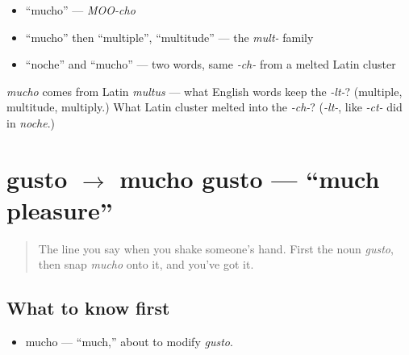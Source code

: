 \begin{itemize}
\raggedright
  \item \textquotedblleft{}mucho\textquotedblright{} — \emph{MOO-cho}
  \item \textquotedblleft{}mucho\textquotedblright{} then \textquotedblleft{}multiple\textquotedblright{}, \textquotedblleft{}multitude\textquotedblright{} — the \emph{mult-} family
  \item \textquotedblleft{}noche\textquotedblright{} and \textquotedblleft{}mucho\textquotedblright{} — two words, same \emph{-ch-} from a melted Latin cluster
\end{itemize}

\begin{tcolorbox}[breakable,colback=teal!4,colframe=teal!35!black,title={Before you move on}]
\emph{mucho} comes from Latin \emph{multus} — what English words keep the \emph{-lt-}? (multiple, multitude, multiply.) What Latin cluster melted into the \emph{-ch-}? (\emph{-lt-}, like \emph{-ct-} did in \emph{noche}.)
\end{tcolorbox}
\section[mucho gusto]{gusto $\to$ mucho gusto — \textquotedblleft{}much pleasure\textquotedblright{}}

\label{lesson:ES-C03-gusto}



\begin{quote}
The line you say when you shake someone's hand. First the noun \emph{gusto}, then snap \emph{mucho} onto it, and you've got it.
\end{quote}

\subsection*{What to know first}
\begin{itemize}
\raggedright
  \item mucho — \textquotedblleft{}much,\textquotedblright{} about to modify \emph{gusto}.
\end{itemize}

